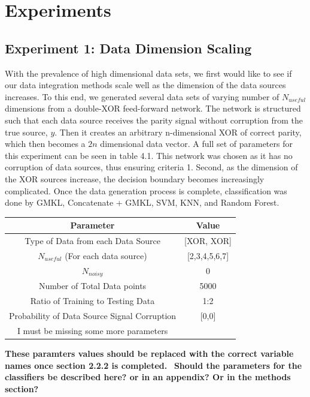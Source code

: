 \documentclass{article}
\begin{document}
\section*{Experiments}



\subsection*{Experiment 1: Data Dimension Scaling}
With the prevalence of high dimensional data sets, we first would like to see
if our data integration methods scale well as the dimension of the data sources
increases. To this end, we generated several data sets of varying number of
$N_{useful}$ dimensions from a double-XOR feed-forward network. The network is
structured such that each data source receives the parity signal without
corruption from the true source, $y$. Then it creates an arbitrary n-dimensional
XOR of correct parity, which then becomes a $2n$ dimensional data vector.  A full
set of parameters for this experiment can be seen in table 4.1. This network was
chosen as it has no corruption of data sources, thus ensuring criteria 1.
Second, as the dimension of the XOR sources increase, the decision boundary becomes
increasingly complicated. Once the data generation process is complete,
classification was done by GMKL, Concatenate + GMKL, SVM, KNN, and Random
Forest.

\begin{table}
\centering
\begin{tabular}{|c c|}
\hline
Parameter & Value \\
\hline
Type of Data from each Data Source & [XOR, XOR]\\
$N_{useful}$ (For each data source) & [2,3,4,5,6,7] \\
$N_{noisy}$& 0\\
Number of Total Data points & 5000\\
Ratio of Training to Testing Data & 1:2\\
Probability of Data Source Signal Corruption & [0,0]\\
I must be missing some more parameters\\
\hline
 \end{tabular}
\end{table}

\textbf{These paramters values should be replaced with the correct variable names once section 2.2.2 is completed. }\
\textbf{Should the parameters for the classifiers be described here? or in an appendix? Or in the methods section? }
\end{document}
